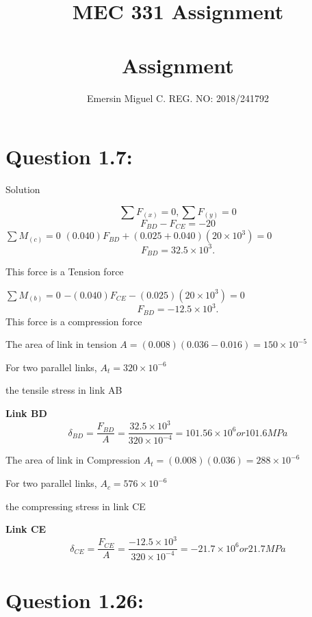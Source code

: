 \documentclass{article}
\title{MEC 331  Assignment}
\author{Emersin Miguel  C. REG. NO: 2018/241792 }
\begin{document}
\maketitle

\newpage

\begin{center}\title{\section*{\textbf{{Assignment}}}}\end{center}
\section*{\textbf{Question 1.7:}}


\begin{center} Solution \end{center}

\[\sum{}F_{(x)}=0,  \sum{}F_{(y)}=0 \]
\[F_{BD} - F_{CE} = -20\]
$\sum{}M_{(c)} = 0$
$(0.040)F_{BD} + (0.025 + 0.040)(20 \times 10^{3}) = 0 $
\[ F_{BD} = 32.5\times 10^{3}.  \]  \begin{center}This force  is a Tension force\end{center}

$\sum{}M_{(b)} = 0$
$-(0.040)F_{CE} - (0.025 )(20 \times 10^{3}) = 0 $
\[ F_{BD} = -12.5\times 10^{3}. \] This force is a compression force



The area of link in tension  $A = (0.008)(0.036 - 0.016) = 150 \times 10 ^{-5}$

For two parallel links, $A_{t} = 320 \times 10 ^ {-6} $

 the tensile stress in link AB


\textbf{Link BD}
\[\delta_{BD} = \frac{F_{BD}}{A} = \frac{32.5 \times 10^{3}}{320 \times 10^{-4}} = {101.56 \times 10^{6}} or 101.6MPa\]

The area of link in Compression  $A_{t}= (0.008)(0.036 ) = 288 \times 10 ^{-6}$

For two parallel links, $A_{c} = 576 \times 10 ^ {-6} $


the compressing stress in link CE

\textbf{Link CE}
\[\delta_{CE} = \frac{F_{CE}}{A} = \frac{-12.5 \times 10^{3}}{320 \times 10^{-4}} = {-21.7 \times 10^{6}} or 21.7MPa\]



\section*{\textbf{Question 1.26:}}
\end{document}
